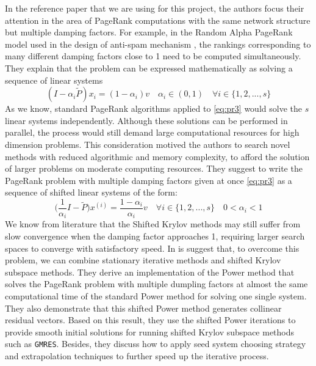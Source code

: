 \noindent In the reference paper that we are using for this project, the authors focus their attention in the area of PageRank computations with the same network structure but multiple damping factors. For example, in the Random Alpha PageRank model used in the design of anti-spam mechanism \cite{Constantine2009Random}, the rankings corresponding to many different damping factors close to 1 need to be computed simultaneously. They explain that the problem can be expressed mathematically as solving a sequence of linear systems
\begin{equation}\label{eq:pr3}
    (I - \alpha_i \tilde P)x_i = (1 - \alpha_i)v \quad  \alpha_i \in (0, 1) \quad \forall i \in \{1, 2, ..., s\}
\end{equation}
As we know, standard PageRank algorithms applied to \ref{eq:pr3} would solve the $s$ linear systems independently. Although these solutions can be performed in parallel, the process would still demand large computational resources for high dimension problems.
This consideration motived the authors to search novel methods with reduced algorithmic and memory complexity, to afford the solution of larger problems on moderate computing resources. They suggest to write the PageRank problem with multiple damping factors given at once \ref{eq:pr3} as a sequence of shifted linear systems of the form:
\begin{equation}
    \Big(\frac{1}{\alpha_i}I - \tilde P \Big)x^{(i)} = \frac{1 - \alpha_i}{\alpha_i}v \quad \forall i \in \{1, 2, ..., s\} \quad 0 < \alpha_i < 1
\end{equation}
We know from literature that the Shifted Krylov methods may still suffer from slow convergence when the damping factor approaches 1, requiring larger search spaces to converge with satisfactory speed. In \cite{SHEN2022126799} is suggest that, to overcome this problem, we can combine stationary iterative methods and shifted Krylov subspace methods. They derive an implementation of the Power method that solves the PageRank problem with multiple dumpling factors at almost the same computational time of the standard Power method for solving one single system. They also demonstrate that this shifted Power method generates collinear residual vectors. Based on this result, they use the shifted Power iterations to provide smooth initial solutions for running shifted Krylov subspace methods such as \texttt{GMRES}. Besides, they discuss how to apply seed system choosing strategy and extrapolation techniques to further speed up the iterative process.

